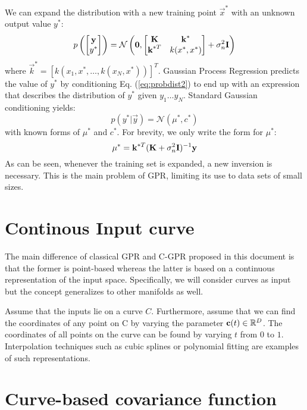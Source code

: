 \documentclass[]{article}
\begin{document}
We can expand the distribution with a new training point $\vec x^*$ with an unknown output value $y^*$:
\begin{equation}
  \label{eq:probdist2}
  p\left(
    \begin{bmatrix}
      \boldsymbol{\mathbf{y}} \\ y^*
    \end{bmatrix}
\right) = \mathcal{N}\left(\boldsymbol{\mathbf{0}},
\begin{bmatrix}
  \boldsymbol{\mathbf{{K}}} & \boldsymbol{\mathbf{k}}^* \\ \boldsymbol{\mathbf{k}}^{*T} & k(x^*, x^*)
\end{bmatrix}
+ \sigma_n^2 \boldsymbol{\mathbf{{I}}}\right)
\end{equation}
where $\vec k^* = [k(x_1, x^*, \hdots, k(x_N, x^*))]^T$. Gaussian Process Regression predicts the value of $y^*$ by conditioning Eq. (\ref{eq:probdist2}) to end up with an expression that describes the distribution of $y^*$ given $y_1 \hdots y_N$. Standard Gaussian conditioning yields:
\begin{equation}
  \label{eq:GPR}
  p(y^* | \vec y) =  \mathcal{N}(\mu^*, c^*)
\end{equation}
with known forms of $\mu^*$ and $c^*$. For brevity, we only write the form for $ \mu^*$:
\begin{equation}
  \label{eq:mustrar}
  \mu^* = \boldsymbol{\mathbf{k}}^{*T}(\boldsymbol{\mathbf{{K}}} + \sigma_n^2 \boldsymbol{\mathbf{{I}}})^{-1}\boldsymbol{\mathbf{y}}
\end{equation}
As can be seen, whenever the training set is expanded, a new inversion is necessary. This is the main problem of GPR, limiting its use to data sets of small sizes.

\section{Continous Input curve}
\label{sec:manifold}
The main difference of classical GPR and C-GPR proposed in this document is that the former is point-based whereas the latter is based on a continuous representation of the input space. Specifically, we will consider curves as input but the concept generalizes to other manifolds as well. 

Assume that the inputs lie on a curve $C$. Furthermore, assume that we can find the coordinates of any point on C by varying the parameter $\boldsymbol{\mathbf{c}}(t) \in \mathbb{R}^D$. The coordinates of all points on the curve can be found by varying $t$ from $0$ to $1$. Interpolation techniques such as cubic splines or polynomial fitting are examples of such representations. 

\section{Curve-based covariance function}
\label{sec:covariancefunction}
\end{document}
